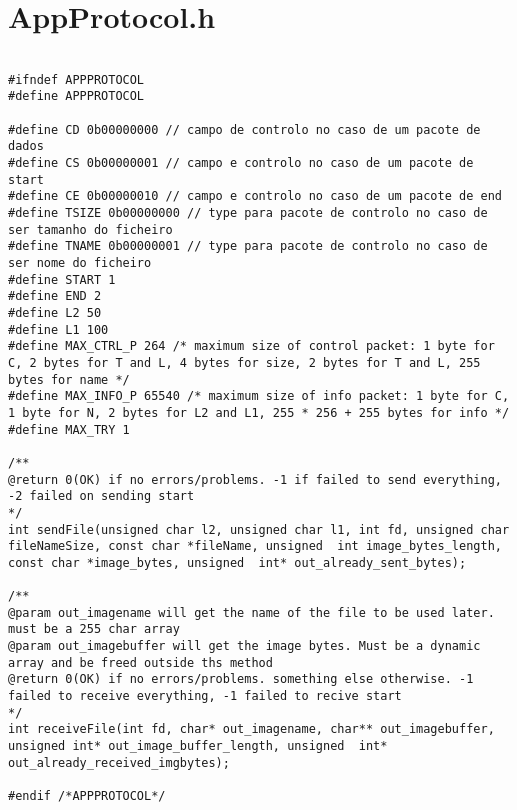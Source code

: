 \section{AppProtocol.h}
\label{APPPROTOCOLH}

\begin{lstlisting}

#ifndef APPPROTOCOL
#define APPPROTOCOL

#define CD 0b00000000 // campo de controlo no caso de um pacote de dados
#define CS 0b00000001 // campo e controlo no caso de um pacote de start
#define CE 0b00000010 // campo e controlo no caso de um pacote de end
#define TSIZE 0b00000000 // type para pacote de controlo no caso de ser tamanho do ficheiro
#define TNAME 0b00000001 // type para pacote de controlo no caso de ser nome do ficheiro
#define START 1
#define END 2
#define L2 50
#define L1 100
#define MAX_CTRL_P 264 /* maximum size of control packet: 1 byte for C, 2 bytes for T and L, 4 bytes for size, 2 bytes for T and L, 255 bytes for name */
#define MAX_INFO_P 65540 /* maximum size of info packet: 1 byte for C, 1 byte for N, 2 bytes for L2 and L1, 255 * 256 + 255 bytes for info */
#define MAX_TRY 1

/**
@return 0(OK) if no errors/problems. -1 if failed to send everything, -2 failed on sending start
*/
int sendFile(unsigned char l2, unsigned char l1, int fd, unsigned char fileNameSize, const char *fileName, unsigned  int image_bytes_length, const char *image_bytes, unsigned  int* out_already_sent_bytes);

/**
@param out_imagename will get the name of the file to be used later. must be a 255 char array
@param out_imagebuffer will get the image bytes. Must be a dynamic array and be freed outside ths method
@return 0(OK) if no errors/problems. something else otherwise. -1 failed to receive everything, -1 failed to recive start
*/
int receiveFile(int fd, char* out_imagename, char** out_imagebuffer, unsigned int* out_image_buffer_length, unsigned  int* out_already_received_imgbytes);

#endif /*APPPROTOCOL*/

\end{lstlisting}
